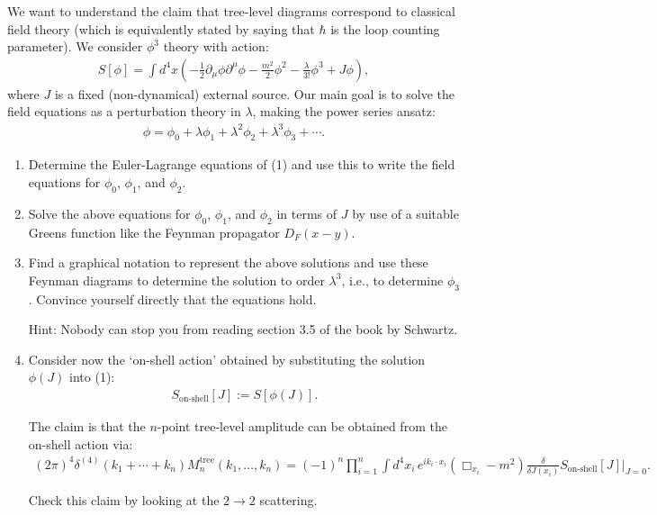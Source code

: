 \documentclass[10pt,a4paper]{article}
\theoremstyle{definition}
\begin{document}
{\color{blue}
We want to understand the claim that tree-level diagrams correspond to classical field theory (which is equivalently stated by saying that $\hbar$ is the loop counting parameter). We consider $\phi^3$ theory with action: 
\begin{align}
S[\phi] = \int d^4x \left( -\frac{1}{2} \partial_\mu \phi \partial^\mu \phi - \frac{m^2}{2}\phi^2 - \frac{\lambda}{3!} \phi^3 + J \phi \right), \tag{1}
\end{align}
 where $J$ is a fixed (non-dynamical) external source. Our main goal is to solve the field equations as a perturbation theory in $\lambda$, making the power series ansatz: 
\begin{align*}
\phi = \phi_0 + \lambda \phi_1 + \lambda^2 \phi_2 + \lambda^3 \phi_3 + \cdots. 
\end{align*}
\begin{enumerate}[1)]
\item Determine the Euler-Lagrange equations of (1) and use this to write the field equations for $\phi_0$, $\phi_1$, and $\phi_2$. 
 
\item Solve the above equations for $\phi_0$, $\phi_1$, and $\phi_2$ in terms of $J$ by use of a suitable Greens function like the Feynman propagator $D_F(x-y)$. 
 
\item Find a graphical notation to represent the above solutions and use these Feynman diagrams to determine the solution to order $\lambda^3$, i.e., to determine $\phi_3$. Convince yourself directly that the equations hold. 

 Hint: Nobody can stop you from reading section 3.5 of the book by Schwartz.  
 
\item Consider now the ‘on-shell action’ obtained by substituting the solution $\phi(J)$ into (1):
\begin{align}
S_{\text{on-shell}}[J] := S[\phi(J)]. \tag{2}
\end{align}

The claim is that the \(n\)-point tree-level amplitude can be obtained from the on-shell action via:
\begin{align}
(2\pi)^4 \delta^{(4)}(k_1 + \cdots + k_n) M^{\text{tree}}_n(k_1, \ldots, k_n)
= (-1)^n \prod_{i=1}^n \int d^4x_i \, e^{ik_i \cdot x_i} \left( \Box_{x_i} - m^2 \right) 
\frac{\delta}{\delta J(x_i)} S_{\text{on-shell}}[J] \bigg|_{J=0}.\tag{3}
\end{align}

Check this claim by looking at the $2 \to 2$ scattering.  

\end{enumerate}
}
\end{document}
